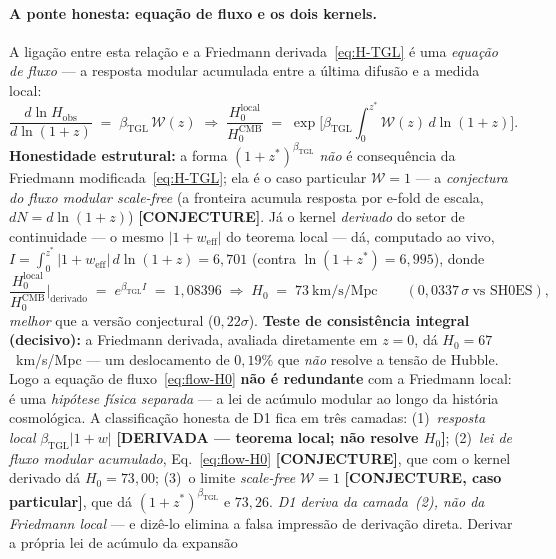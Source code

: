 \documentclass[12pt,a4paper]{article}
\newcommand{\betatgl}{\beta_{\text{TGL}}}
\begin{document}
\paragraph{A ponte honesta: equação de fluxo e os dois kernels.}
A ligação entre esta relação e a Friedmann derivada~\eqref{eq:H-TGL} é uma
\emph{equação de fluxo} --- a resposta modular acumulada entre a última difusão e a
medida local:
\begin{equation}
\frac{d\ln H_{\mathrm{obs}}}{d\ln(1+z)} \;=\; \betatgl\,\mathcal W(z)
\;\Longrightarrow\;
\frac{H_0^{\mathrm{local}}}{H_0^{\mathrm{CMB}}}
\;=\; \exp\!\Big[\betatgl\!\int_0^{z^*}\!\mathcal W(z)\,d\ln(1+z)\Big].
\label{eq:flow-H0}
\end{equation}
\textbf{Honestidade estrutural:} a forma $(1+z^*)^{\betatgl}$ \emph{não} é
consequência da Friedmann modificada~\eqref{eq:H-TGL}; ela é o caso particular
$\mathcal W=1$ --- a \emph{conjectura do fluxo modular scale-free} (a fronteira
acumula resposta por e-fold de escala, $dN=d\ln(1+z)$) \textbf{[CONJECTURE]}.
Já o kernel \emph{derivado} do setor de continuidade --- o mesmo
$|1+w_{\text{eff}}|$ do teorema local --- dá, computado ao vivo,
$I=\int_0^{z^*}|1+w_{\text{eff}}|\,d\ln(1+z)=6{,}701$
(contra $\ln(1+z^*)=6{,}995$), donde
\begin{equation}
\frac{H_0^{\mathrm{local}}}{H_0^{\mathrm{CMB}}}\bigg|_{\mathrm{derivado}}
\;=\; e^{\betatgl I} \;=\; 1{,}08396
\;\Rightarrow\;
H_0 \;=\; 73~\text{km/s/Mpc}
\qquad (0{,}0337\,\sigma\ \text{vs SH0ES}),
\label{eq:H0-derived}
\end{equation}
\emph{melhor} que a versão conjectural ($0{,}22\sigma$).  \textbf{Teste de
consistência integral (decisivo):} a Friedmann derivada, avaliada diretamente em
$z=0$, dá $H_0 = 67$~km/s/Mpc --- um deslocamento de
$0{,}19\%$ que \emph{não} resolve a tensão de Hubble.  Logo a equação de
fluxo~\eqref{eq:flow-H0} \textbf{não é redundante} com a Friedmann local: é uma
\emph{hipótese física separada} --- a lei de acúmulo modular ao longo da história
cosmológica.  A classificação honesta de D1 fica em três camadas:
(1)~\emph{resposta local} $\betatgl|1+w|$ \textbf{[DERIVADA --- teorema local; não
resolve $H_0$]}; (2)~\emph{lei de fluxo modular acumulado},
Eq.~\eqref{eq:flow-H0} \textbf{[CONJECTURE]}, que com o kernel derivado dá
$H_0=73{,}00$; (3)~o limite \emph{scale-free} $\mathcal W=1$
\textbf{[CONJECTURE, caso particular]}, que dá $(1+z^*)^{\betatgl}$ e $73{,}26$.
\emph{D1 deriva da camada~(2), não da Friedmann local} --- e dizê-lo elimina a
falsa impressão de derivação direta.  Derivar a própria lei de acúmulo da expansão
\end{document}
